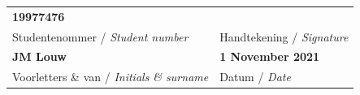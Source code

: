\vfill

\noindent \begin{tabularx}{1.0\linewidth}{|L|L|}
    \hline
    \vspace{12mm} \textbf{19977476}                                       & \hspace{5mm}  \\
    {Studentenommer / \textit{Student number}}              & {Handtekening / \textit{Signature}} \\
    \hline
    \textbf{JM Louw}                                        & \textbf{1 November 2021}\\
    {Voorletters \& van / \textit{Initials \& surname}}     & {Datum / \textit{Date}} \\
    \hline
\end{tabularx}

\vspace{15pt}


%
%
%
%
%

